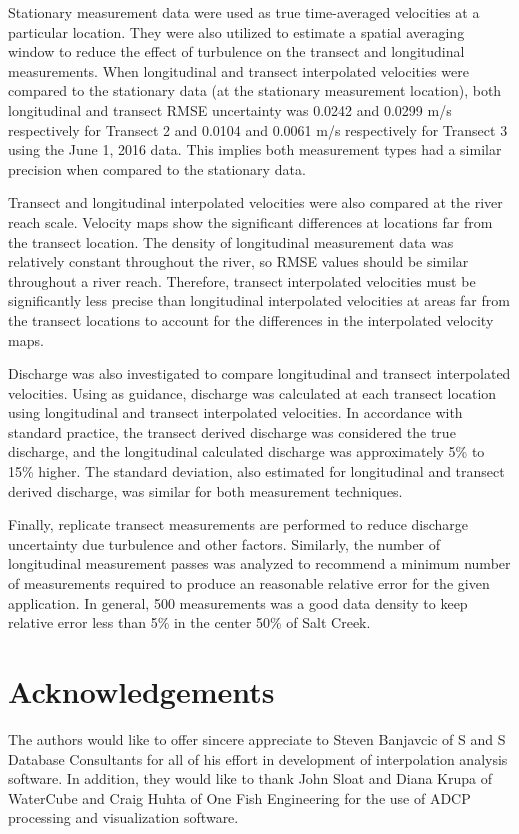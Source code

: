 \documentclass[Journal,letterpaper,BackFigs]{ascelike-new}
\begin{document}
Stationary measurement data were used as true time-averaged velocities at a particular location. They were also utilized to estimate a spatial averaging window to reduce the effect of turbulence on the transect and longitudinal measurements. When longitudinal and transect interpolated velocities were compared to the stationary data (at the stationary measurement location), both longitudinal and transect RMSE uncertainty was 0.0242 and 0.0299 m/s respectively for Transect 2 and 0.0104 and 0.0061 m/s respectively for Transect 3 using the June 1, 2016 data. This implies both measurement types had a similar precision when compared to the stationary data.

Transect and longitudinal interpolated velocities were also compared at the river reach scale. Velocity maps show the significant  differences at locations far from the transect location. The density of longitudinal measurement data was relatively constant throughout the river, so RMSE values should be similar throughout a river reach. Therefore, transect interpolated velocities must be significantly less precise than longitudinal interpolated velocities at areas far from the transect locations to account for the differences in the interpolated velocity maps.

Discharge was also investigated to compare longitudinal and transect interpolated velocities. Using  as guidance, discharge was calculated at each transect location using longitudinal and transect interpolated velocities. In accordance with standard practice, the transect derived discharge was considered the true discharge, and the longitudinal calculated discharge was approximately 5\% to 15\% higher. The standard deviation, also estimated for longitudinal and transect derived discharge, was similar for both measurement techniques.

Finally, replicate transect measurements are performed to reduce discharge uncertainty due turbulence and other factors. Similarly, the number of longitudinal measurement passes was analyzed to recommend a minimum number of measurements required to produce an reasonable relative error for the given application. In general, 500 measurements was a good data density to keep relative error less than 5\% in the center 50\% of Salt Creek.

\section{Acknowledgements}
The authors would like to offer sincere appreciate to Steven Banjavcic of S and S Database Consultants for all of his effort in development of interpolation analysis software. In addition, they would like to thank John Sloat and Diana Krupa of WaterCube and Craig Huhta of One Fish Engineering for the use of ADCP processing and visualization software.

\pagebreak

%
\end{document}
